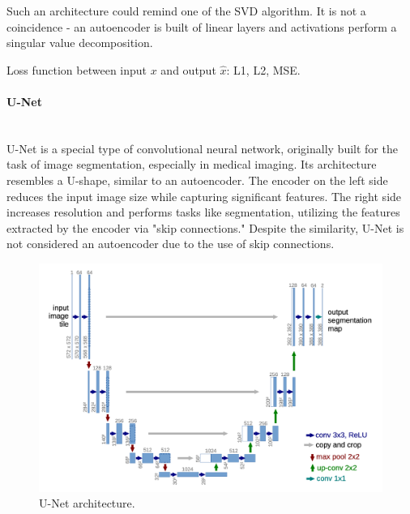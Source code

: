 Such an architecture could remind one of the SVD algorithm. It is not a coincidence - an autoencoder is built of linear layers and activations perform a singular value decomposition.   

Loss function between input $x$ and output $\hat{x}$:
L1, L2, MSE.

\paragraph{U-Net}\mbox{}\\
\indent U-Net is a special type of convolutional neural network, originally built for the task of image segmentation, especially in medical imaging. Its architecture resembles a U-shape, similar to an autoencoder. The encoder on the left side reduces the input image size while capturing significant features. The right side increases resolution and performs tasks like segmentation, utilizing the features extracted by the encoder via "skip connections." Despite the similarity, U-Net is not considered an autoencoder due to the use of skip connections.

\begin{figure}[H]
    \centering
    \includegraphics[width=0.9\linewidth]{concept_engineering/unet/U-net.png}
    \caption{U-Net architecture.}
    \label{fig:unet}
\end{figure}



